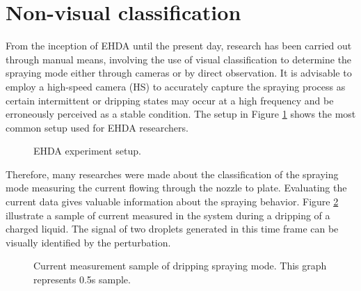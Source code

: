 \section{Non-visual classification}
\label{sec:non-visual-classification}

From the inception of EHDA until the present day, research has been carried out through manual means, involving the use of visual classification to determine the spraying mode either through cameras or by direct observation. It is advisable to employ a high-speed camera (HS) to accurately capture the spraying process as certain intermittent or dripping states may occur at a high frequency and be erroneously perceived as a stable condition.
The setup in Figure \ref{fig:ehda_setup} shows the most common setup used for EHDA researchers.

\begin{figure}[H]
  \centering
  \caption{EHDA experiment setup\cite{Luewton}.}
  \label{fig:ehda_setup}
\end{figure}


Therefore, many researches were made about the classification of the spraying mode measuring the current flowing through the nozzle to plate\cite{Sjaaks}\cite{Chen_Pui}. 
Evaluating the current data gives valuable information about the spraying behavior.
Figure \ref{fig:microdripping_current_pic} illustrate a sample of current measured in the system during a dripping of a charged liquid. 
The signal of two droplets generated in this time frame can be visually identified by the perturbation.


\begin{figure}[H]
    \centering
    \caption{Current measurement sample of dripping spraying mode. This graph represents 0.5s sample.}
    \label{fig:microdripping_current_pic}
  \end{figure}

